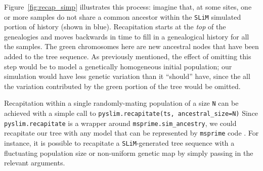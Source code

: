 \documentclass[12pt]{article}
\newcommand{\msprime}[0]{\texttt{msprime}\xspace}
\newcommand{\slim}[0]{\texttt{SLiM}\xspace}
\newcommand*{\ie}{i.e.\xcomma}
\begin{document}
Figure~\ref{fig:recap_simp} illustrates this process: imagine that, at some sites, one or more samples do not share
a common ancestor within the \slim simulated portion of history (shown in blue).
Recapitation starts at the \textit{top} of the genealogies and moves backwards in time
to fill in a genealogical history for all the samples.
The green chromosomes here are new ancestral nodes that have been added to the tree sequence.
As previously mentioned, the effect of omitting this step would be to model a genetically homogeneous initial population;
our simulation would have less genetic variation than it ``should'' have, since the all the variation
contributed by the green portion of the tree would be omitted.


Recapitation within a single randomly-mating population of a size \verb|N|
can be achieved with a simple call to \verb|pyslim.recapitate(ts, ancestral_size=N)|
Since \verb|pyslim.recapitate| is a wrapper around
\verb|msprime.sim_ancestry|, we could recapitate our tree with any model that can be represented by \msprime code \citep{baumdicker_efficient_2022}.
For instance, it is possible to recapitate a \slim-generated tree sequence with a fluctuating population size
or non-uniform genetic map by simply passing in the relevant arguments.
\end{document}
